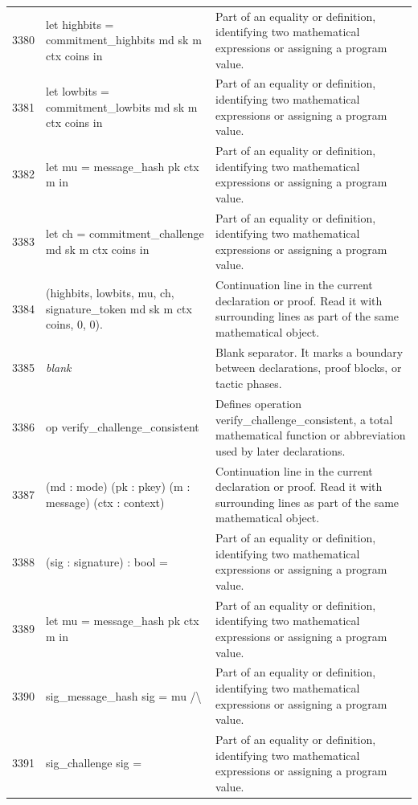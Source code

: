 \documentclass[10pt]{article}
\begin{document}
\begin{longtable}{r L{0.53\textwidth} L{0.37\textwidth}}
3380 & {\ttfamily\scriptsize     let highbits = commitment\_highbits md sk m ctx coins in} & Part of an equality or definition, identifying two mathematical expressions or assigning a program value. \\
3381 & {\ttfamily\scriptsize     let lowbits = commitment\_lowbits md sk m ctx coins in} & Part of an equality or definition, identifying two mathematical expressions or assigning a program value. \\
3382 & {\ttfamily\scriptsize     let mu = message\_hash pk ctx m in} & Part of an equality or definition, identifying two mathematical expressions or assigning a program value. \\
3383 & {\ttfamily\scriptsize     let ch = commitment\_challenge md sk m ctx coins in} & Part of an equality or definition, identifying two mathematical expressions or assigning a program value. \\
3384 & {\ttfamily\scriptsize     (highbits, lowbits, mu, ch, signature\_token md sk m ctx coins, 0, 0).} & Continuation line in the current declaration or proof.  Read it with surrounding lines as part of the same mathematical object. \\
3385 & {\ttfamily\scriptsize \emph{blank}} & Blank separator.  It marks a boundary between declarations, proof blocks, or tactic phases. \\
3386 & {\ttfamily\scriptsize op verify\_challenge\_consistent} & Defines operation verify\_challenge\_consistent, a total mathematical function or abbreviation used by later declarations. \\
3387 & {\ttfamily\scriptsize    (md : mode) (pk : pkey) (m : message) (ctx : context)} & Continuation line in the current declaration or proof.  Read it with surrounding lines as part of the same mathematical object. \\
3388 & {\ttfamily\scriptsize    (sig : signature) : bool =} & Part of an equality or definition, identifying two mathematical expressions or assigning a program value. \\
3389 & {\ttfamily\scriptsize   let mu = message\_hash pk ctx m in} & Part of an equality or definition, identifying two mathematical expressions or assigning a program value. \\
3390 & {\ttfamily\scriptsize   sig\_message\_hash sig = mu /\textbackslash{}} & Part of an equality or definition, identifying two mathematical expressions or assigning a program value. \\
3391 & {\ttfamily\scriptsize   sig\_challenge sig =} & Part of an equality or definition, identifying two mathematical expressions or assigning a program value. \\

\end{longtable}
\end{document}

